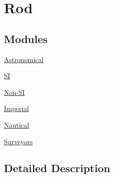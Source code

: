\hypertarget{group___e_g_x_math-_conversions-_length_conversions-_imperial-_rod}{}\section{Rod}
\label{group___e_g_x_math-_conversions-_length_conversions-_imperial-_rod}
\subsection*{Modules}
\begin{DoxyCompactItemize}
\item 
\mbox{\hyperlink{group___e_g_x_math-_conversions-_length_conversions-_imperial-_rod-_astronomical}{Astronomical}}
\item 
\mbox{\hyperlink{group___e_g_x_math-_conversions-_length_conversions-_imperial-_rod-_s_i}{SI}}
\item 
\mbox{\hyperlink{group___e_g_x_math-_conversions-_length_conversions-_imperial-_rod-_non-_s_i}{Non-\/\+SI}}
\item 
\mbox{\hyperlink{group___e_g_x_math-_conversions-_length_conversions-_imperial-_rod-_imperial}{Imperial}}
\item 
\mbox{\hyperlink{group___e_g_x_math-_conversions-_length_conversions-_imperial-_rod-_nautical}{Nautical}}
\item 
\mbox{\hyperlink{group___e_g_x_math-_conversions-_length_conversions-_imperial-_rod-_surveyors}{Surveyors}}
\end{DoxyCompactItemize}


\subsection{Detailed Description}
